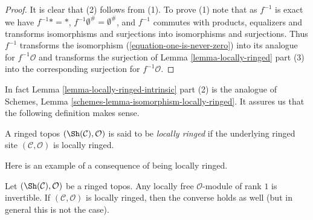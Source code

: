 \begin{proof}
It is clear that (2) follows from (1). To prove (1) note that
as $f^{-1}$ is exact we have $f^{-1}* = *$,
$f^{-1}\emptyset^\# = \emptyset^\#$, and $f^{-1}$ commutes with
products, equalizers and transforms isomorphisms and surjections
into isomorphisms and surjections. Thus $f^{-1}$ transforms the
isomorphism (\ref{equation-one-is-never-zero}) into
its analogue for $f^{-1}\mathcal{O}$ and transforms the surjection of
Lemma \ref{lemma-locally-ringed} part (3)
into the corresponding surjection for $f^{-1}\mathcal{O}$.
\end{proof}

\noindent
In fact
Lemma \ref{lemma-locally-ringed-intrinsic} part (2)
is the analogue of
Schemes, Lemma \ref{schemes-lemma-isomorphism-locally-ringed}.
It assures us that the following definition makes sense.

\begin{definition}
\label{definition-locally-ringed-topos}
A ringed topos $(\Sh(\mathcal{C}), \mathcal{O})$ is said to be
{\it locally ringed} if the underlying ringed site
$(\mathcal{C}, \mathcal{O})$ is locally ringed.
\end{definition}

\noindent
Here is an example of a consequence of being locally ringed.

\begin{lemma}
\label{lemma-invertible-is-locally-free-rank-1}
Let $(\Sh(\mathcal{C}), \mathcal{O})$ be a ringed topos. Any locally free
$\mathcal{O}$-module of rank $1$ is invertible.
If $(\mathcal{C}, \mathcal{O})$ is locally ringed, then
the converse holds as well (but in general this is not the case).
\end{lemma}


